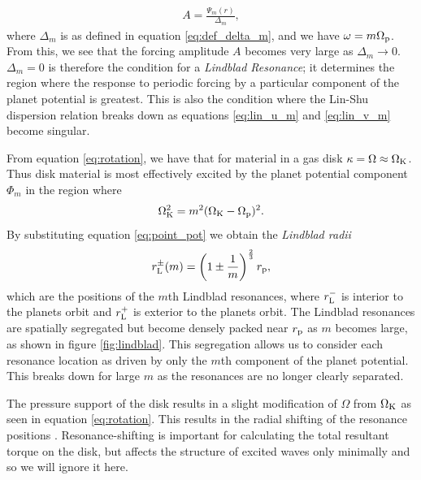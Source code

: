 \begin{align}
    A = \frac{\Psi_m (r)}{\Delta_m},
\end{align}
where $\Delta_m$ is as defined in equation \ref{eq:def_delta_m}, and we have $\omega = m \Omega_{\rm p} $.
From this, we see that the forcing amplitude $A$ becomes very large as $\Delta_m \rightarrow 0$.
$\Delta_m = 0$ is therefore the condition for a \textit{Lindblad Resonance}; it determines the region where the response to periodic forcing by a particular component of the planet potential is greatest.
This is also the condition where the Lin-Shu dispersion relation breaks down as equations \ref{eq:lin_u_m} and \ref{eq:lin_v_m} become singular.

From equation \ref{eq:rotation}, we have that for material in a gas disk $\kappa = \Omega \approx \Omega_{\rm K}$.
Thus disk material is most effectively excited by the planet potential component $\Phi_m$ in the region where
\begin{align}
    \Omega_{\rm K}^2 = m^2 (\Omega_{\rm K} - \Omega_{\rm p})^2.
\end{align}
By substituting equation \ref{eq:point_pot} we obtain the \textit{Lindblad radii}
\begin{align}
    r_{\rm L}^\pm(m) = \left( 1 \pm \frac{1}{m} \right)^\frac{2}{3} r_{\rm p}, \label{eq:lind_loc}
\end{align}
which are the positions of the $m$th Lindblad resonances, where $r_{\rm L}^-$ is interior to the planets orbit and $r_{\rm L}^+$ is exterior to the planets orbit.
The Lindblad resonances are spatially segregated but become densely packed near $r_{\rm p}$ as $m$ becomes large, as shown in figure \ref{fig:lindblad}.
This segregation allows us to consider each resonance location as driven by only the $m$th component of the planet potential.
This breaks down for large $m$ as the resonances are no longer clearly separated.

The pressure support of the disk results in a slight modification of $\Omega$ from $\Omega_{\rm K}$ as seen in equation \ref{eq:rotation}.
This results in the radial shifting of the resonance positions \citep{artymowicz1993a}.
Resonance-shifting is important for calculating the total resultant torque on the disk, but affects the structure of excited waves only minimally and so we will ignore it here.


